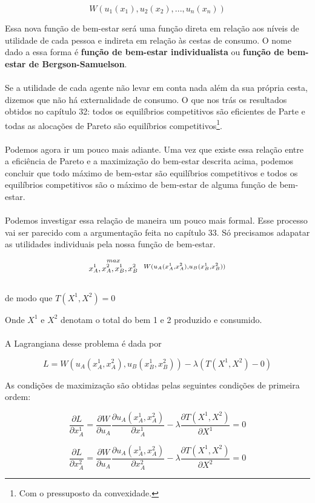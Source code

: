 \documentclass[a4paper,11pt,oneside]{book}
\theoremstyle{definition}
\theoremstyle{break}
\begin{document}
$$ W(u_1(x_1),u_2(x_2),...,u_n(x_n)) $$

Essa nova função de bem-estar será uma função direta em relação aos níveis de utilidade de cada pessoa e indireta em relação às cestas de consumo. O nome dado a essa forma é \textbf{função de bem-estar individualista} ou \textbf{função de bem-estar de Bergson-Samuelson}.
\\~\\
Se a utilidade de cada agente não levar em conta nada além da sua própria cesta, dizemos que não há externalidade de consumo. O que nos trás os resultados obtidos no capítulo 32: todos os equilíbrios competitivos são eficientes de Parte e todas as alocações de Pareto são equilíbrios competitivos\footnote{Com o pressuposto da convexidade.}.
\\~\\
Podemos agora ir um pouco mais adiante. Uma vez que existe essa relação entre a eficiência de Pareto e a maximização do bem-estar descrita acima, podemos concluir que todo máximo de bem-estar são equilíbrios competitivos e todos os equilíbrios competitivos são o máximo de bem-estar de alguma função de bem-estar.
\\~\\
Podemos investigar essa relação de maneira um pouco mais formal. Esse processo vai ser parecido com a argumentação feita no capítulo 33. Só precisamos adapatar as utilidades individuais pela nossa função de bem-estar.

\begin{center}
	\LARGE $$ \stackrel{max}{\text{\small $x_A^1,x_A^2,x_B^1,x_B^2$}} \ \ \stackrel{W(u_A(x_A^1,x_A^2),u_B(x_B^1,x_B^2))}{\ } $$
	\\
	\normalsize de modo que $T(X^1,X^2) = 0$
\end{center}

Onde $X^1$ e $X^2$ denotam o total do bem 1 e 2 produzido e consumido.
\\~\\
A Lagrangiana desse problema é dada por

$$ L = W(u_A(x_A^1,x_A^2),u_B(x_B^1,x_B^2)) - \lambda(T(X^1,X^2) - 0) $$

As condições de maximização são obtidas pelas seguintes condições de primeira ordem:

$$ \frac{\partial L}{\partial x_A^1} = \frac{\partial W}{\partial u_A} \frac{\partial u_A(x_A^1,x_A^2)}{\partial x_A^1} - \lambda \frac{\partial T(X^1,X^2)}{\partial X^1} = 0 $$

$$ \frac{\partial L}{\partial x_A^2} = \frac{\partial W}{\partial u_A} \frac{\partial u_A(x_A^1,x_A^2)}{\partial x_A^2} - \lambda \frac{\partial T(X^1,X^2)}{\partial X^2} = 0 $$
\end{document}
